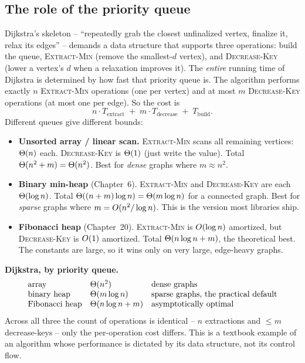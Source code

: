 \subsection{The role of the priority queue}

Dijkstra's skeleton -- ``repeatedly grab the closest unfinalized vertex, finalize
it, relax its edges'' -- demands a data structure that supports three operations:
build the queue, \textsc{Extract-Min} (remove the smallest-$d$ vertex), and
\textsc{Decrease-Key} (lower a vertex's $d$ when a relaxation improves it). The
\emph{entire} running time of Dijkstra is determined by how fast that priority
queue is. The algorithm performs exactly $n$ \textsc{Extract-Min} operations (one
per vertex) and at most $m$ \textsc{Decrease-Key} operations (at most one per
edge). So the cost is
\[
n \cdot T_{\text{extract}} \;+\; m \cdot T_{\text{decrease}} \;+\; T_{\text{build}}.
\]
Different queues give different bounds:

\begin{itemize}
\item \textbf{Unsorted array / linear scan.} \textsc{Extract-Min} scans all
remaining vertices: $\Theta(n)$ each. \textsc{Decrease-Key} is $\Theta(1)$ (just write
the value). Total $\Theta(n^2 + m) = \Theta(n^2)$. Best for \emph{dense} graphs where
$m \approx n^2$.
\item \textbf{Binary min-heap} (Chapter~6). \textsc{Extract-Min} and
\textsc{Decrease-Key} are each $\Theta(\log n)$. Total
$\Theta((n+m)\log n) = \Theta(m \log n)$ for a connected graph. Best for \emph{sparse}
graphs where $m = O(n^2/\log n)$. This is the version most libraries ship.
\item \textbf{Fibonacci heap} (Chapter~20). \textsc{Extract-Min} is
$O(\log n)$ amortized, but \textsc{Decrease-Key} is $O(1)$ amortized. Total
$\Theta(n\log n + m)$, the theoretical best. The constants are large, so it wins only
on very large, edge-heavy graphs.
\end{itemize}

\begin{complexitybox}
\textbf{Dijkstra, by priority queue.}
\[
\begin{array}{lll}
\text{array} & \Theta(n^2) & \text{dense graphs}\\
\text{binary heap} & \Theta(m\log n) & \text{sparse graphs, the practical default}\\
\text{Fibonacci heap} & \Theta(n\log n + m) & \text{asymptotically optimal}
\end{array}
\]
Across all three the count of operations is identical -- $n$ extractions and $\le
m$ decrease-keys -- only the per-operation cost differs. This is a textbook example
of an algorithm whose performance is dictated by its data structure, not its
control flow.
\end{complexitybox}

